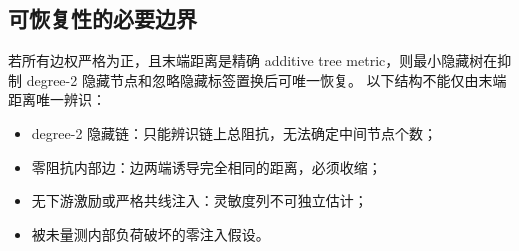 \subsection{可恢复性的必要边界}

若所有边权严格为正，且末端距离是精确 additive tree metric，则最小隐藏树在抑制
degree-2 隐藏节点和忽略隐藏标签置换后可唯一恢复\cite{buneman1971,semple2003}。
以下结构不能仅由末端距离唯一辨识：
\begin{itemize}
  \item degree-2 隐藏链：只能辨识链上总阻抗，无法确定中间节点个数；
  \item 零阻抗内部边：边两端诱导完全相同的距离，必须收缩；
  \item 无下游激励或严格共线注入：灵敏度列不可独立估计；
  \item 被未量测内部负荷破坏的零注入假设。
\end{itemize}
